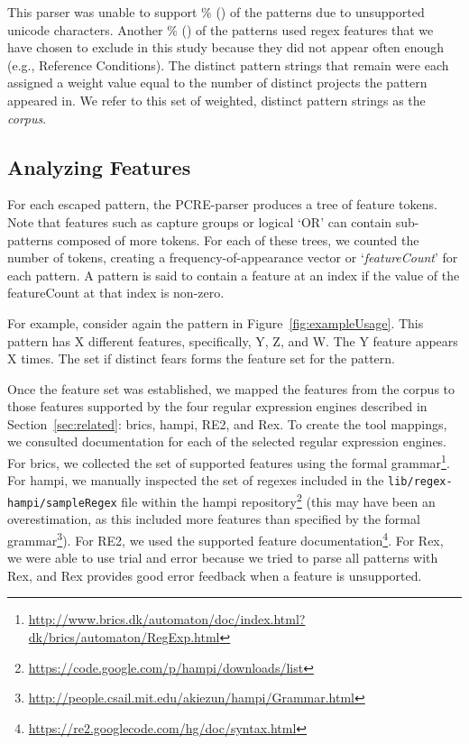 This parser was unable to support \% () of the patterns due to unsupported unicode characters.  Another \% () of the patterns used regex features that we have chosen to exclude in this study because they did not appear often enough (e.g., Reference Conditions).  The  distinct pattern strings that remain were each assigned a weight value equal to the number of distinct projects the pattern appeared in.  We  refer to this set of weighted, distinct pattern strings as the \emph{corpus}.

\subsection{Analyzing Features}
\label{study:features}
For each escaped pattern, the PCRE-parser produces a tree of feature tokens. Note that features such as capture groups or logical `OR' can contain sub-patterns composed of more tokens.  For each of these trees, we counted the number of tokens, creating a frequency-of-appearance vector or `\emph{featureCount}' for each pattern.  A pattern is said to contain a feature at an index if the value of the featureCount at that index is non-zero.

For example, consider again the pattern in Figure~\ref{fig:exampleUsage}. This pattern has X different features, specifically, Y, Z, and W. The Y feature appears X times. The set if distinct fears forms the feature set for the pattern.

Once the feature set was established, we mapped the features from the corpus to those features supported by the four regular expression engines described in Section~\ref{sec:related}: brics, hampi, RE2, and Rex.
To create the tool mappings, we consulted documentation for each of the selected regular expression engines. For brics, we collected the set of supported features using the formal grammar\footnote{\url{http://www.brics.dk/automaton/doc/index.html?dk/brics/automaton/RegExp.html}}.  For hampi, we manually inspected the set of regexes included in the {\tt lib/regex-hampi/sampleRegex} file within the hampi repository\footnote{\url{https://code.google.com/p/hampi/downloads/list}} (this may have been an overestimation, as this included more features than specified by the formal grammar\footnote{\url{http://people.csail.mit.edu/akiezun/hampi/Grammar.html}}).  For RE2, we used the  supported feature documentation\footnote{\url{https://re2.googlecode.com/hg/doc/syntax.html}}.  For Rex, we were able to use trial and error because we tried to parse all patterns with Rex, and Rex provides good error feedback when a feature is unsupported.

